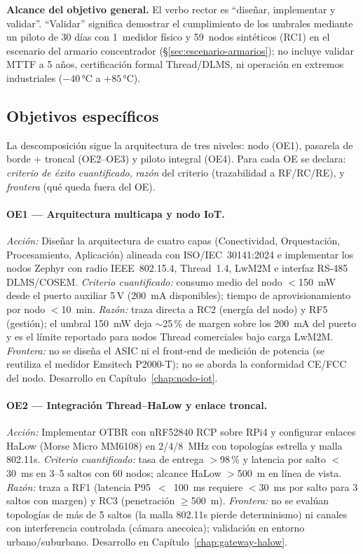 \textbf{Alcance del objetivo general.} El verbo rector es ``diseñar, implementar y validar''. ``Validar'' significa demostrar el cumplimiento de los umbrales mediante un piloto de 30 días con 1~medidor físico y 59~nodos sintéticos (RC1) en el escenario del armario concentrador (§\ref{sec:escenario-armarios}); no incluye validar MTTF a 5 años, certificación formal Thread/DLMS, ni operación en extremos industriales ($-40$\,°C a $+85$\,°C).

\subsection{Objetivos específicos}
\label{sec:objetivos-especificos}

La descomposición sigue la arquitectura de tres niveles: nodo (OE1), pasarela de borde + troncal (OE2--OE3) y piloto integral (OE4). Para cada OE se declara: \emph{criterio de éxito cuantificado}, \emph{razón} del criterio (trazabilidad a RF/RC/RE), y \emph{frontera} (qué queda fuera del OE).

\paragraph{OE1 --- Arquitectura multicapa y nodo IoT.}
\textit{Acción:} Diseñar la arquitectura de cuatro capas (Conectividad, Orquestación, Procesamiento, Aplicación) alineada con ISO/IEC~30141:2024 e implementar los nodos Zephyr con radio IEEE~802.15.4, Thread~1.4, LwM2M e interfaz RS-485 DLMS/COSEM.
\textit{Criterio cuantificado:} consumo medio del nodo $<$150~mW desde el puerto auxiliar 5\,V (200~mA disponibles); tiempo de aprovisionamiento por nodo $<$10~min.
\textit{Razón:} traza directa a RC2 (energía del nodo) y RF5 (gestión); el umbral 150~mW deja $\sim$25\,\% de margen sobre los 200~mA del puerto y es el límite reportado para nodos Thread comerciales bajo carga LwM2M.
\textit{Frontera:} no se diseña el ASIC ni el front-end de medición de potencia (se reutiliza el medidor Emsitech P2000-T); no se aborda la conformidad CE/FCC del nodo. Desarrollo en Capítulo~\ref{chap:nodo-iot}.

\paragraph{OE2 --- Integración Thread--HaLow y enlace troncal.}
\textit{Acción:} Implementar OTBR con nRF52840 RCP sobre RPi4 y configurar enlaces HaLow (Morse Micro MM6108) en 2/4/8~MHz con topologías estrella y malla 802.11s.
\textit{Criterio cuantificado:} tasa de entrega $>$98\,\% y latencia por salto $<$30~ms en 3--5 saltos con 60 nodos; alcance HaLow $>$500~m en línea de vista.
\textit{Razón:} traza a RF1 (latencia P95~$<$~100~ms requiere $<$30~ms por salto para 3 saltos con margen) y RC3 (penetración $\geq$500~m).
\textit{Frontera:} no se evalúan topologías de más de 5 saltos (la malla 802.11s pierde determinismo) ni canales con interferencia controlada (cámara anecoica); validación en entorno urbano/suburbano. Desarrollo en Capítulo~\ref{chap:gateway-halow}.


